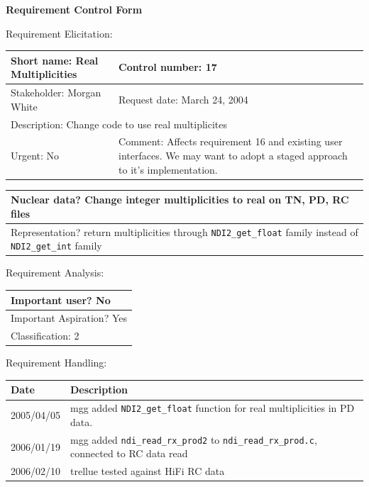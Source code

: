 \begin{center}\Large\bf
Requirement Control Form
\end{center}
\vspace{24pt}

Requirement Elicitation:

\begin{tabular}{|p{211pt}|p{211pt}|} \hline
Short name: Real Multiplicities & Control number: 17 \\ \hline
Stakeholder: Morgan White & Request date: March 24, 2004 \\ \hline
\multicolumn{2}{|l|}{Description: Change code to use real
multiplicites} \\ \hline
Urgent: No & Comment: Affects requirement 16 and existing user
interfaces.  We may want to adopt a staged approach to it's
implementation. \\ \hline
\end{tabular}

\vspace{12pt}

\begin{tabular}{|p{433pt}|} \hline
Nuclear data? Change integer multiplicities to real on TN, PD, RC files \\ \hline
Representation? return multiplicities through
\texttt{NDI2\_get\_float} family instead of \texttt{NDI2\_get\_int} family \\ \hline
\end{tabular}
\vspace{24pt}

Requirement Analysis:

\begin{tabular}{|p{433pt}|} \hline
Important user? No \\ \hline
Important Aspiration? Yes \\ \hline
Classification: 2 \\ \hline
\end{tabular}
\vspace{24pt}

Requirement Handling:

\begin{tabular}{|p{72pt}|p{351pt}|} \hline
Date & Description \\ \hline
2005/04/05 & mgg added \texttt{NDI2\_get\_float} function for real
multiplicities in PD data. \\ \hline
2006/01/19 & mgg added \texttt{ndi\_read\_rx\_prod2} to 
\texttt{ndi\_read\_rx\_prod.c}, connected to RC data read \\ \hline
2006/02/10 & trellue tested against HiFi RC data\\ \hline
\end{tabular}
